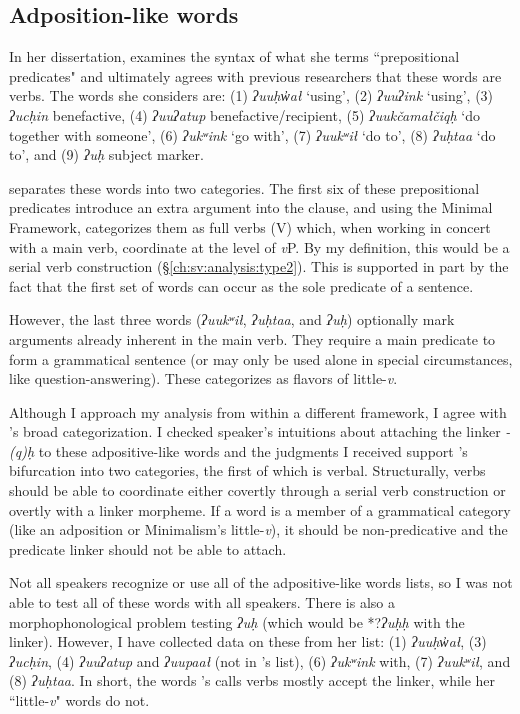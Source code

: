 \subsection{Adposition-like words} \label{ch:link:adpositive}

In her dissertation, \cite{woo2007b} examines the syntax of what she terms ``prepositional predicates" and ultimately agrees with previous researchers that these words are verbs. The words she considers are: (1) \textit{ʔuuḥw̓ał} `using', (2) \textit{ʔuuʔink} `using', (3) \textit{ʔucḥin} benefactive, (4) \textit{ʔuuʔatup} benefactive/recipient, (5) \textit{ʔuukčamałčiqḥ} `do together with someone', (6) \textit{ʔukʷink} `go with', (7) \textit{ʔuukʷił} `do to', (8) \textit{ʔuḥtaa} `do to', and (9) \textit{ʔuḥ} subject marker.

\citeauthor{woo2007b} separates these words into two categories. The first six of these prepositional predicates introduce an extra argument into the clause, and using the Minimal Framework, \citeauthor{woo2007b} categorizes them as full verbs (V) which, when working in concert with a main verb, coordinate at the level of \textit{v}P. By my definition, this would be a serial verb construction (\S\ref{ch:sv:analysis:type2}). This is supported in part by the fact that the first set of words can occur as the sole predicate of a sentence.

However, the  last three words (\textit{ʔuukʷił}, \textit{ʔuḥtaa}, and \textit{ʔuḥ}) optionally mark arguments already inherent in the main verb. They require a main predicate to form a grammatical sentence (or may only be used alone in special circumstances, like question-answering). These \citeauthor{woo2007b} categorizes as flavors of little-\textit{v}.

Although I approach my analysis from within a different framework, I agree with \citeauthor{woo2007b}'s broad categorization. I checked speaker's intuitions about attaching the linker \textit{-(q)ḥ} to these adpositive-like words and the judgments I received support \citeauthor{woo2007b}'s bifurcation into two categories, the first of which is verbal. Structurally, verbs should be able to coordinate either covertly through a serial verb construction or overtly with a linker morpheme. If a word is a member of a grammatical category (like an adposition or Minimalism's little-\textit{v}), it should be non-predicative and the predicate linker should not be able to attach.

Not all speakers recognize or use all of the adpositive-like words \citeauthor{woo2007b} lists, so I was not able to test all of these words with all speakers. There is also a morphophonological problem testing \textit{ʔuḥ} (which would be *?\textit{ʔuḥḥ} with the linker). However, I have collected data on these from her list: (1) \textit{ʔuuḥw̓ał}, (3) \textit{ʔucḥin}, (4) \textit{ʔuuʔatup} and \textit{ʔuupaał} (not in \citeauthor{woo2007b}'s list), (6) \textit{ʔukʷink} with, (7) \textit{ʔuukʷił}, and (8) \textit{ʔuḥtaa}. In short, the words \citeauthor{woo2007b}'s calls verbs mostly accept the linker, while her ``little-\textit{v}" words do not.

